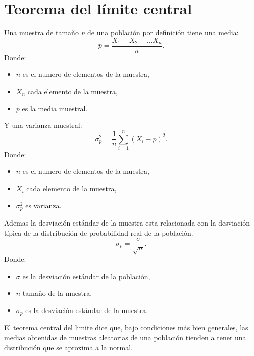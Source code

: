 \documentclass[]{article}
\begin{document}
\section{Teorema del límite central}
Una muestra de tamaño \textit{n} de una población por definición tiene una media:
\[ p = \frac{X_{1} + X_{2} +...X_{n}}{n}.\]
Donde:
\begin{itemize}
	\item $n$ es el numero de elementos de la muestra,
	\item $X_{n}$ cada elemento de la muestra,
	\item $p$ es la media muestral.
\end{itemize}
Y una varianza muestral:
\[ \sigma_{p}^{2} = \frac{1}{n}\sum_{i=1}^{n}(X_ {i} - p)^{2}.\]
Donde:
\begin{itemize}
	\item $n$ es el numero de elementos de la muestra,
	\item $X_{i}$ cada elemento de la muestra,
	\item $\sigma_{p}^{2}$ es varianza.
\end{itemize}
Ademas la desviación estándar de la muestra esta relacionada con la desviación típica de la distribución de probabilidad real de la población.
\[ \sigma_{p} = \frac{\sigma}{\sqrt{n}}.\]
Donde:
\begin{itemize}
	\item $\sigma$ es la desviación estándar de la población,
	\item $n$ tamaño de la muestra,
	\item $\sigma_{p}$ es la desviación estándar de la muestra.
\end{itemize}
El teorema central del limite dice que, bajo condiciones más bien generales, las medias obtenidas de muestras aleatorias de una población tienden a tener una distribución que se aproxima a la normal.
\end{document}
